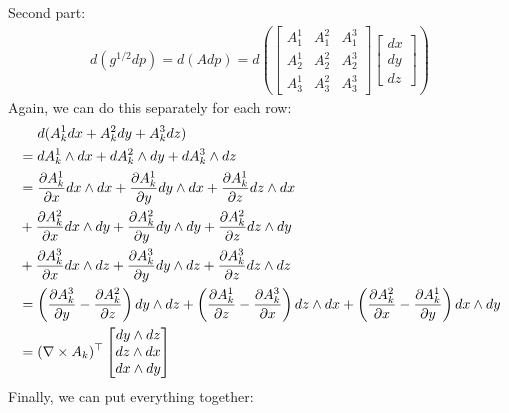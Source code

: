 \documentclass[a4paper,twoside,openright,11pt]{report}
\begin{document}
Second part:
\begin{align*}
  d(g^{1/2}dp)= d(Adp) = d\left(\begin{bmatrix}
    A^1_1 & A^2_1 & A^3_1 \\
    A^1_2 & A^2_2 & A^3_2 \\
    A^1_3 & A^2_3 & A^3_3
  \end{bmatrix}
  \begin{bmatrix}
    dx \\ dy \\ dz
  \end{bmatrix}
  \right)
\end{align*}
Again, we can do this separately for each row:
\begin{align*}
  & \hspace{1.35em} d(A^1_k dx + A^2_k dy + A^3_k dz) \\
  &= dA^1_k \wedge dx + dA^2_k \wedge dy + dA^3_k \wedge dz \\
  &= \frac{\partial A^1_k}{\partial x}dx \wedge dx + \frac{\partial A^1_k}{\partial y}dy \wedge dx + \frac{\partial A^1_k}{\partial z}dz \wedge dx \\
  &+ \frac{\partial A^2_k}{\partial x}dx \wedge dy + \frac{\partial A^2_k}{\partial y}dy \wedge dy + \frac{\partial A^2_k}{\partial z}dz \wedge dy \\
  &+ \frac{\partial A^3_k}{\partial x}dx \wedge dz + \frac{\partial A^3_k}{\partial y}dy \wedge dz + \frac{\partial A^3_k}{\partial z}dz \wedge dz \\
  &= \left( \frac{\partial A^3_k}{\partial y} - \frac{\partial A^2_k}{\partial z} \right) dy \wedge dz + \left( \frac{\partial A^1_k}{\partial z} - \frac{\partial A^3_k}{\partial x} \right) dz \wedge dx + \left( \frac{\partial A^2_k}{\partial x} - \frac{\partial A^1_k}{\partial y} \right) dx \wedge dy \\
  &= (\nabla \times A_k)^{\top} \begin{bmatrix}
    dy \wedge dz \\ dz \wedge dx \\ dx \wedge dy
  \end{bmatrix} 
\end{align*}
Finally, we can put everything together:
\end{document}
